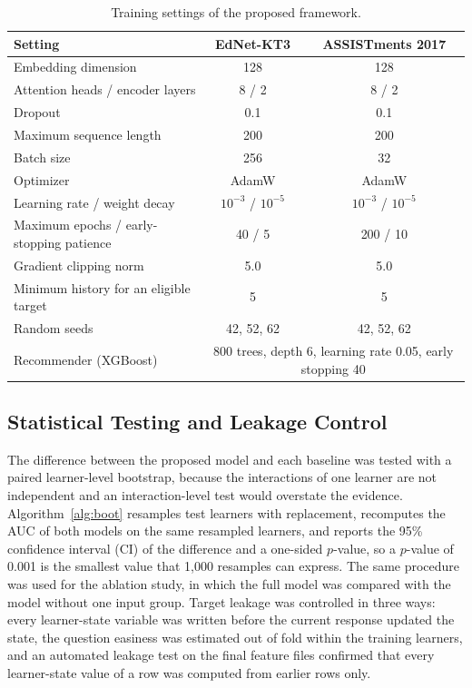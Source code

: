 \documentclass[11pt]{article}
\begin{document}
\begin{table}[t]
\centering
\caption{Training settings of the proposed framework.}
\label{tab:hyper}
\small
\begin{tabular}{@{}lcc@{}}
\toprule
Setting & EdNet-KT3 & ASSISTments 2017 \\
\midrule
Embedding dimension & 128 & 128 \\
Attention heads / encoder layers & 8 / 2 & 8 / 2 \\
Dropout & 0.1 & 0.1 \\
Maximum sequence length & 200 & 200 \\
Batch size & 256 & 32 \\
Optimizer & AdamW & AdamW \\
Learning rate / weight decay & $10^{-3}$ / $10^{-5}$ & $10^{-3}$ / $10^{-5}$ \\
Maximum epochs / early-stopping patience & 40 / 5 & 200 / 10 \\
Gradient clipping norm & 5.0 & 5.0 \\
Minimum history for an eligible target & 5 & 5 \\
Random seeds & 42, 52, 62 & 42, 52, 62 \\
Recommender (XGBoost) & \multicolumn{2}{c}{800 trees, depth 6, learning rate 0.05, early stopping 40} \\
\bottomrule
\end{tabular}
\end{table}

\subsection{Statistical Testing and Leakage Control}

The difference between the proposed model and each baseline was tested with a paired learner-level bootstrap, because the interactions of one learner are not independent and an interaction-level test would overstate the evidence. Algorithm~\ref{alg:boot} resamples test learners with replacement, recomputes the AUC of both models on the same resampled learners, and reports the 95\% confidence interval (CI) of the difference and a one-sided $p$-value, so a $p$-value of 0.001 is the smallest value that 1,000 resamples can express. The same procedure was used for the ablation study, in which the full model was compared with the model without one input group. Target leakage was controlled in three ways: every learner-state variable was written before the current response updated the state, the question easiness was estimated out of fold within the training learners, and an automated leakage test on the final feature files confirmed that every learner-state value of a row was computed from earlier rows only. %
\end{document}
